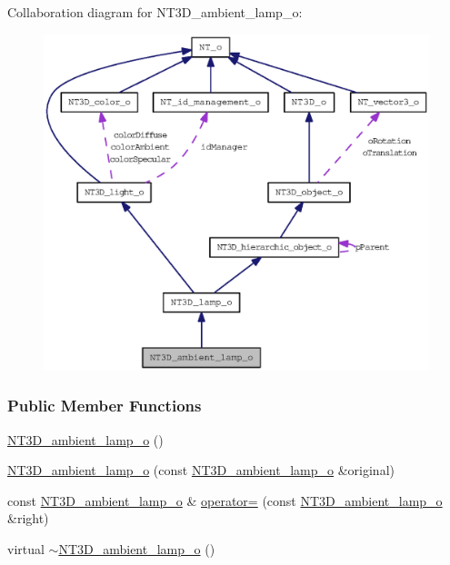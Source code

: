 Collaboration diagram for NT3D\_\-ambient\_\-lamp\_\-o:
\nopagebreak
\begin{figure}[H]
\begin{center}
\leavevmode
\includegraphics[width=400pt]{class_n_t3_d__ambient__lamp__o__coll__graph}
\end{center}
\end{figure}
\subsubsection*{Public Member Functions}
\begin{DoxyCompactItemize}
\item 
\hyperlink{class_n_t3_d__ambient__lamp__o_ad0f40f5b41b31808b0c6876af607f32f}{NT3D\_\-ambient\_\-lamp\_\-o} ()
\item 
\hyperlink{class_n_t3_d__ambient__lamp__o_aa528b671ca42390f24c33e932da3a59f}{NT3D\_\-ambient\_\-lamp\_\-o} (const \hyperlink{class_n_t3_d__ambient__lamp__o}{NT3D\_\-ambient\_\-lamp\_\-o} \&original)
\item 
const \hyperlink{class_n_t3_d__ambient__lamp__o}{NT3D\_\-ambient\_\-lamp\_\-o} \& \hyperlink{class_n_t3_d__ambient__lamp__o_a1f703e1b51b0948c9709037842b7f84d}{operator=} (const \hyperlink{class_n_t3_d__ambient__lamp__o}{NT3D\_\-ambient\_\-lamp\_\-o} \&right)
\item 
virtual \hyperlink{class_n_t3_d__ambient__lamp__o_a45f349df308871718049bfe16843c4b8}{$\sim$NT3D\_\-ambient\_\-lamp\_\-o} ()
\end{DoxyCompactItemize}


